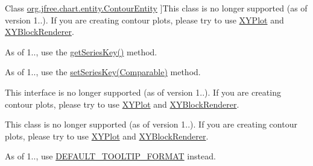 \begin{DoxyRefList}
%
Class \mbox{\hyperlink{classorg_1_1jfree_1_1chart_1_1entity_1_1_contour_entity}{org.jfree.chart.entity.Contour\+Entity}} ]This class is no longer supported (as of version 1..). If you are creating contour plots, please try to use \mbox{\hyperlink{}{X\+Y\+Plot}} and \mbox{\hyperlink{}{X\+Y\+Block\+Renderer}}.  
\item[\label{deprecated__deprecated000048}%
\Hypertarget{deprecated__deprecated000048}%
Member \mbox{\hyperlink{classorg_1_1jfree_1_1chart_1_1entity_1_1_legend_item_entity_ab37af6a271e6d5d48afd0ff80a5a440d}{org.jfree.chart.entity.Legend\+Item\+Entity.get\+Series\+Index}} ()]As of 1.., use the \mbox{\hyperlink{classorg_1_1jfree_1_1chart_1_1entity_1_1_legend_item_entity_adcd94e383c12091bc60065e4f73bac2a}{get\+Series\+Key()}} method.  
\item[\label{deprecated__deprecated000049}%
\Hypertarget{deprecated__deprecated000049}%
Member \mbox{\hyperlink{classorg_1_1jfree_1_1chart_1_1entity_1_1_legend_item_entity_ab4fa4fb654292b30900965b21e4f904b}{org.jfree.chart.entity.Legend\+Item\+Entity.set\+Series\+Index}} (int index)]As of 1.., use the \mbox{\hyperlink{classorg_1_1jfree_1_1chart_1_1entity_1_1_legend_item_entity_aad5679e1643d398bfd7f0eaed1a5d521}{set\+Series\+Key(\+Comparable)}} method.  
\item[\label{deprecated__deprecated000050}%
\Hypertarget{deprecated__deprecated000050}%
Class \mbox{\hyperlink{interfaceorg_1_1jfree_1_1chart_1_1labels_1_1_contour_tool_tip_generator}{org.jfree.chart.labels.Contour\+Tool\+Tip\+Generator}} ]This interface is no longer supported (as of version 1..). If you are creating contour plots, please try to use \mbox{\hyperlink{}{X\+Y\+Plot}} and \mbox{\hyperlink{}{X\+Y\+Block\+Renderer}}.  
\item[\label{deprecated__deprecated000051}%
\Hypertarget{deprecated__deprecated000051}%
Class \mbox{\hyperlink{classorg_1_1jfree_1_1chart_1_1labels_1_1_standard_contour_tool_tip_generator}{org.jfree.chart.labels.Standard\+Contour\+Tool\+Tip\+Generator}} ]This class is no longer supported (as of version 1..). If you are creating contour plots, please try to use \mbox{\hyperlink{}{X\+Y\+Plot}} and \mbox{\hyperlink{}{X\+Y\+Block\+Renderer}}.  
\item[\label{deprecated__deprecated000052}%
\Hypertarget{deprecated__deprecated000052}%
Member \mbox{\hyperlink{classorg_1_1jfree_1_1chart_1_1labels_1_1_standard_pie_tool_tip_generator_a5dc585e904200ee2586253a2bb6bb390}{org.jfree.chart.labels.Standard\+Pie\+Tool\+Tip\+Generator.D\+E\+F\+A\+U\+L\+T\+\_\+\+S\+E\+C\+T\+I\+O\+N\+\_\+\+L\+A\+B\+E\+L\+\_\+\+F\+O\+R\+M\+AT}} ]As of 1.., use \mbox{\hyperlink{classorg_1_1jfree_1_1chart_1_1labels_1_1_standard_pie_tool_tip_generator_a815aa512e809e115970498d4a1d6ea76}{D\+E\+F\+A\+U\+L\+T\+\_\+\+T\+O\+O\+L\+T\+I\+P\+\_\+\+F\+O\+R\+M\+AT}} instead.  

\end{DoxyRefList}

